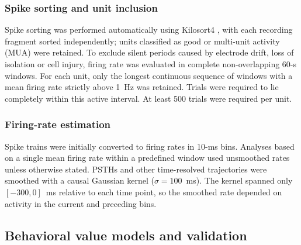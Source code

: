 \documentclass[pdflatex,sn-mathphys-num]{sn-jnl}%
\begin{document}
\subsubsection{Spike sorting and unit inclusion}\label{sec:m_units}
Spike sorting was performed automatically using Kilosort4 \cite{pachitariu2024kilosort4}, with each recording fragment sorted independently; units classified as good or multi-unit activity (MUA) were retained. To exclude silent periods caused by electrode drift, loss of isolation or cell injury, firing rate was evaluated in complete non-overlapping 60-s windows. For each unit, only the longest continuous sequence of windows with a mean firing rate strictly above 1~Hz was retained. Trials were required to lie completely within this active interval. At least 500 trials were required per unit.

\subsubsection{Firing-rate estimation}
Spike trains were initially converted to firing rates in 10-ms bins. Analyses based on a single mean firing rate within a predefined window used unsmoothed rates unless otherwise stated. PSTHs and other time-resolved trajectories were smoothed with a causal Gaussian kernel ($\sigma = 100$~ms). The kernel spanned only $[-300,0]$~ms relative to each time point, so the smoothed rate depended on activity in the current and preceding bins.

\subsection{Behavioral value models and validation}
\end{document}

